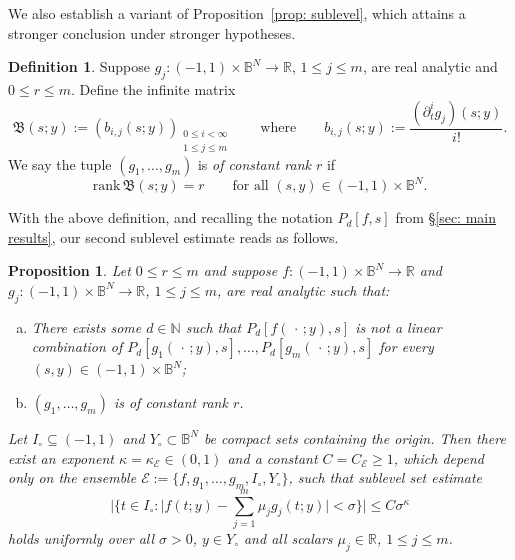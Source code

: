 \documentclass[reqno]{amsart}
\numberwithin{equation}{section}
\newcommand{\B}{\mathbb{B}}
\newcommand{\N}{\mathbb{N}}
\newcommand{\R}{\mathbb{R}}
\newcommand{\sE}{\mathscr{E}}
\newcommand{\fB}{\mathfrak{B}}
\theoremstyle{plain}
\newtheorem{proposition}[theorem]{Proposition}
\theoremstyle{definition}
\newtheorem{definition}[theorem]{Definition}
\newcommand{\rank}{\mathrm{rank}\,}
\begin{document}
We also establish a variant of Proposition~\ref{prop: sublevel}, which attains a stronger conclusion under stronger hypotheses. 

\begin{definition} Suppose $g_j \colon (-1,1) \times \B^N \to \R$, $1 \leq j \leq m$, are real analytic and $0 \leq r \leq m$. Define the infinite matrix
\begin{equation}\label{eq: rank hyp}
   \fB(s;y) := (b_{i,j}(s;y))_{\substack{ 0 \leq i < \infty \\ 1 \leq j \leq m}} \qquad \textrm{where} \qquad b_{i,j}(s;y) := \frac{(\partial_t^i g_j)(s;y) }{i!}.
\end{equation}
We say the tuple $(g_1, \dots, g_m)$ is \textit{of constant rank $r$} if 
\begin{equation*}
  \rank \fB(s;y) = r \qquad \textrm{for all $(s, y) \in (-1,1) \times \B^N$.}
\end{equation*}
\end{definition}

With the above definition, and recalling the notation $P_d[f,s]$ from \S\ref{sec: main results}, our second sublevel estimate reads as follows. 

\begin{proposition}\label{prop: sublevel slice}  Let $0 \leq r \leq m$ and suppose $f \colon (-1,1) \times \B^N \to \R$ and $g_j \colon (-1,1) \times \B^N \to \R$, $1 \leq j \leq m$, are real analytic such that:
\begin{enumerate}[a)]
    \item There exists some $d \in \N$ such that $P_d[f(\,\cdot\,; y),s]$ is not a linear combination of $P_d[g_1(\,\cdot\,; y),s], \dots, P_d[g_m(\,\cdot\,; y),s]$ for every $(s, y) \in (-1,1) \times \B^N$;
    \item $(g_1, \dots, g_m)$ is of constant rank $r$.
\end{enumerate}
Let $I_{\circ} \subseteq (-1,1)$ and $Y_{\circ} \subset \B^N$ be compact sets containing the origin. Then there exist an exponent $\kappa = \kappa_{\sE}  \in (0,1)$ and a constant $C = C_\sE \geq 1$, which depend only on the ensemble $\sE := \{f, g_1, \dots, g_m, I_{\circ}, Y_{\circ}\}$, such that sublevel set estimate
\begin{equation}\label{eq: sublevel slice}
    \Big|\Big\{t \in I_{\circ} : \big|f(t;y) - \sum_{j=1}^m \mu_j g_j(t;y)\big| < \sigma\Big\}\Big| \leq C \sigma^{\kappa}
\end{equation}
holds uniformly over all $\sigma > 0$, $y \in Y_{\circ}$ and all scalars $\mu_j \in \R$, $1 \leq j \leq m$. 
\end{proposition}
\end{document}
